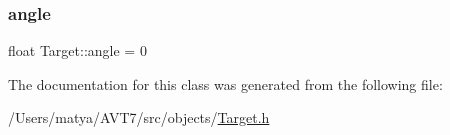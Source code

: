 \subsubsection{\texorpdfstring{angle}{angle}}
{\footnotesize\ttfamily float Target\+::angle = 0}



The documentation for this class was generated from the following file\+:\begin{DoxyCompactItemize}
\item 
/\+Users/matya/\+A\+V\+T7/src/objects/\hyperlink{_target_8h}{Target.\+h}\end{DoxyCompactItemize}

